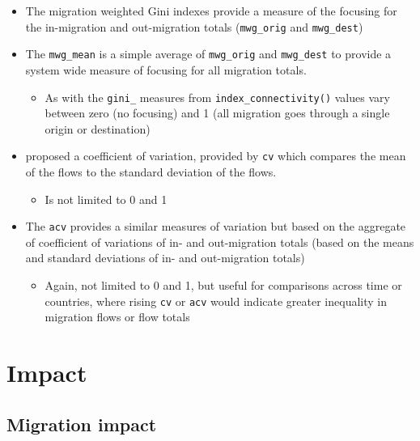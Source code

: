 \documentclass[
]{book}
\providecommand{\tightlist}{%
  \setlength{\itemsep}{0pt}\setlength{\parskip}{0pt}}
\begin{document}
\begin{itemize}
\tightlist
\item
  The migration weighted Gini indexes provide a measure of the focusing for the in-migration and out-migration totals (\texttt{mwg\_orig} and \texttt{mwg\_dest})
\item
  The \texttt{mwg\_mean} is a simple average of \texttt{mwg\_orig} and \texttt{mwg\_dest} to provide a system wide measure of focusing for all migration totals.

  \begin{itemize}
  \tightlist
  \item
    As with the \texttt{gini\_} measures from \texttt{index\_connectivity()} values vary between zero (no focusing) and 1 (all migration goes through a single origin or destination)
  \end{itemize}
\item
  \citet{Rogers1998} proposed a coefficient of variation, provided by \texttt{cv} which compares the mean of the flows to the standard deviation of the flows.

  \begin{itemize}
  \tightlist
  \item
    Is not limited to 0 and 1
  \end{itemize}
\item
  The \texttt{acv} provides a similar measures of variation but based on the aggregate of coefficient of variations of in- and out-migration totals (based on the means and standard deviations of in- and out-migration totals)

  \begin{itemize}
  \tightlist
  \item
    Again, not limited to 0 and 1, but useful for comparisons across time or countries, where rising \texttt{cv} or \texttt{acv} would indicate greater inequality in migration flows or flow totals
  \end{itemize}
\end{itemize}

\hypertarget{impact}{%
\section{Impact}\label{impact}}

\hypertarget{migration-impact}{%
\subsection{Migration impact}\label{migration-impact}}
\end{document}
